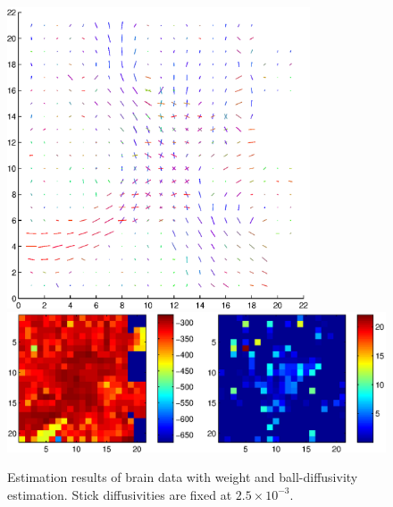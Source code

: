 \documentclass{article}
\begin{document}
\begin{figure}[H]
  \caption{Estimation results of brain data with weight and ball-diffusivity estimation. Stick diffusivities are fixed at $2.5\times 10^{-3}$.}
  \centering
  \includegraphics[width=0.8\textwidth]{figures/brain_modbas_weights_dir.eps}
  \includegraphics[width=\textwidth]{figures/brain_modbas_weights_like.eps}
\end{figure}
\end{document}
